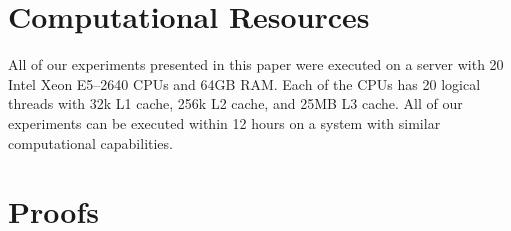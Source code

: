 \documentclass{uai2022} %
\begin{document}
\section{Computational Resources}\label{section:resources}
 All of our experiments presented in this paper were executed on a server with 20 Intel Xeon E5--2640 CPUs and 64GB RAM.
Each of the CPUs has 20 logical threads with 32k L1 cache, 256k L2 cache, and 25MB L3 cache.
All of our experiments can be executed within 12 hours on a system with similar computational capabilities.




\section{Proofs}\label{section:proofs}
%

\printProofs
\end{document}
